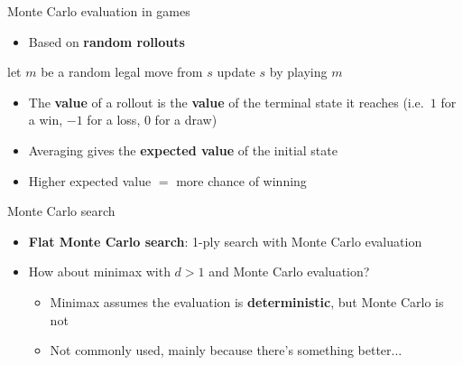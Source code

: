 \begin{frame}{Monte Carlo evaluation in games}
	\begin{itemize}
		\pause\item Based on \textbf{random rollouts}
	\end{itemize}
	\pause
	\begin{algorithmic}
			\State let $m$ be a random legal move from $s$
			\State update $s$ by playing $m$
		\EndWhile
	\end{algorithmic}
	\begin{itemize}
		\pause\item The \textbf{value} of a rollout is the \textbf{value} of the terminal state it reaches (i.e.\ $1$ for a win, $-1$ for a loss, $0$ for a draw)
		\pause\item Averaging gives the \textbf{expected value} of the initial state
		\pause\item Higher expected value $=$ more chance of winning
	\end{itemize}
\end{frame}

\begin{frame}{Monte Carlo search}
	\begin{itemize}
		\pause\item \textbf{Flat Monte Carlo search}: 1-ply search with Monte Carlo evaluation
		\pause\item How about minimax with $d>1$ and Monte Carlo evaluation?
			\begin{itemize}
				\pause\item Minimax assumes the evaluation is \textbf{deterministic}, but Monte Carlo is not
				\pause\item Not commonly used, mainly because there's something better...
			\end{itemize}
	\end{itemize}
\end{frame}

